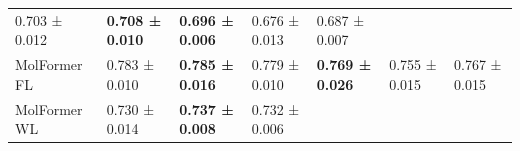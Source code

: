 \documentclass[
  10pt,
]{article}
\begin{document}
\begin{longtable}[]{@{}lllllll@{}}
\begin{minipage}[t]{0.12\columnwidth}
0.703 ± 0.012\strut
\end{minipage} & \begin{minipage}[t]{0.12\columnwidth}\raggedright
\textbf{0.708 ± 0.010}\strut
\end{minipage} & \begin{minipage}[t]{0.12\columnwidth}\raggedright
\textbf{0.696 ± 0.006}\strut
\end{minipage} & \begin{minipage}[t]{0.12\columnwidth}\raggedright
0.676 ± 0.013\strut
\end{minipage} & \begin{minipage}[t]{0.12\columnwidth}\raggedright
0.687 ± 0.007\strut
\end{minipage}\tabularnewline
\begin{minipage}[t]{0.12\columnwidth}\raggedright
MolFormer FL\strut
\end{minipage} & \begin{minipage}[t]{0.12\columnwidth}\raggedright
0.783 ± 0.010\strut
\end{minipage} & \begin{minipage}[t]{0.12\columnwidth}\raggedright
\textbf{0.785 ± 0.016}\strut
\end{minipage} & \begin{minipage}[t]{0.12\columnwidth}\raggedright
0.779 ± 0.010\strut
\end{minipage} & \begin{minipage}[t]{0.12\columnwidth}\raggedright
\textbf{0.769 ± 0.026}\strut
\end{minipage} & \begin{minipage}[t]{0.12\columnwidth}\raggedright
0.755 ± 0.015\strut
\end{minipage} & \begin{minipage}[t]{0.12\columnwidth}\raggedright
0.767 ± 0.015\strut
\end{minipage}\tabularnewline
\begin{minipage}[t]{0.12\columnwidth}\raggedright
MolFormer WL\strut
\end{minipage} & \begin{minipage}[t]{0.12\columnwidth}\raggedright
0.730 ± 0.014\strut
\end{minipage} & \begin{minipage}[t]{0.12\columnwidth}\raggedright
\textbf{0.737 ± 0.008}\strut
\end{minipage} & \begin{minipage}[t]{0.12\columnwidth}\raggedright
0.732 ± 0.006\strut
\end{minipage} & \begin{minipage}[t]{0.12\columnwidth}\raggedright

\end{minipage}
\end{longtable}
\end{document}
